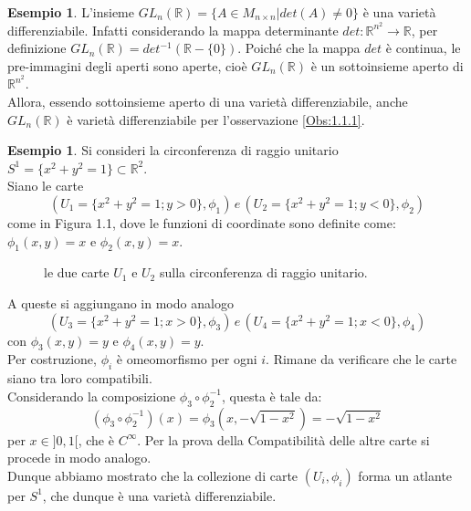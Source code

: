 \documentclass[12pt,a4paper]{report}
\theoremstyle{definition}
\theoremstyle{Theorem}
\theoremstyle{definition}
\newtheorem{Ex}[Def]{Esempio}
\theoremstyle{definition}
\theoremstyle{definition}
\begin{document}
\begin{Ex} \label{Ex 1.1}
	L'insieme $GL_n(\mathbb{R})=\{A\in M_{n\times n}|det(A)\neq0\}$ è una varietà differenziabile.
	Infatti considerando la mappa determinante $det:\mathbb{R}^{n^2}\rightarrow \mathbb{R}$, per definizione $GL_n(\mathbb{R})=det^{-1}(\mathbb{R}-\{0\})$. Poiché che la mappa $det$ è continua, le pre-immagini degli aperti sono aperte, cioè $GL_n(\mathbb{R})$ è un sottoinsieme aperto di $\mathbb{R}^{n^2}$.\\
	Allora, essendo sottoinsieme aperto di una varietà differenziabile, anche $GL_n(\mathbb{R})$ è varietà differenziabile per l'osservazione \ref{Obs:1.1.1}.\\
\end{Ex}
\begin{Ex}
	Si consideri la circonferenza di raggio unitario $S^1=\{x^2+y^2=1\}\subset \mathbb{R}^2$.\\
	Siano le carte $$(U_1=\{x^2+y^2=1;y>0\},\phi_1) \, e \,  (U_2=\{x^2+y^2=1;y<0\},\phi_2)$$ come in Figura 1.1, dove le funzioni di coordinate sono definite come: $\phi_1(x,y)=x$ e $\phi_2(x,y)=x$.
	\begin{figure}[H]
		\centering
	\label{figura 1}
	\caption{le due carte $U_1$ e $U_2$ sulla circonferenza di raggio unitario.}
	\end{figure}
A queste si aggiungano in modo analogo $$(U_3=\{x^2+y^2=1;x>0\},\phi_3)\, e \, (U_4=\{x^2+y^2=1;x<0\},\phi_4)$$ con $\phi_3(x,y)=y$ e $\phi_4(x,y)=y$.\\
Per costruzione, $\phi_i$ è omeomorfismo per ogni $i$. Rimane da verificare che le carte siano tra loro compatibili.\\
Considerando la composizione $\phi_3\circ\phi_2^{-1}$, questa è tale da: $$(\phi_3\circ\phi_2^{-1})(x)=\phi_3(x,-\sqrt{1-x^2})=-\sqrt{1-x^2}$$ per $x\in ]0,1[$, che è $C^\infty$. Per la prova della Compatibilità delle altre carte si procede in modo analogo.\\ 
Dunque abbiamo mostrato che la collezione di carte $(U_i,\phi_i)$ forma un atlante per $S^1$, che dunque è una varietà differenziabile.
\end{Ex}
\end{document}
